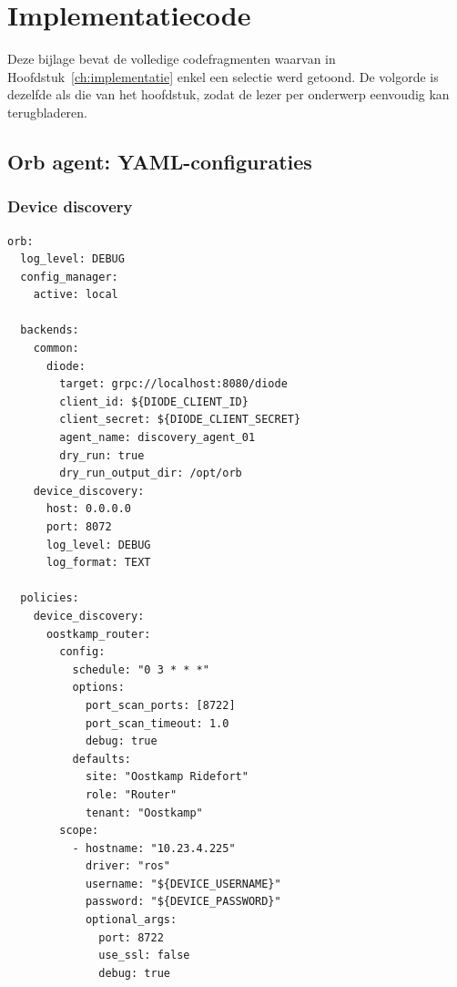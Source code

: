 
\chapter{Implementatiecode}%
\label{ch:bijlage-implementatie}

Deze bijlage bevat de volledige codefragmenten waarvan in Hoofdstuk~\ref{ch:implementatie} enkel een selectie werd getoond. De volgorde is dezelfde als die van het hoofdstuk, zodat de lezer per onderwerp eenvoudig kan terugbladeren.

\section{Orb agent: YAML-configuraties}
\label{sec:bijlage-orb-yaml}

\subsection{Device discovery}

\begin{listing}[H]
  \caption[Orb agent voor device discovery]{Volledige Orb-agentconfiguratie voor device discovery via Diode (\S\ref{sec:architectuur})}
  \label{lst:orb-device-discovery-config}
  \begin{verbatim}
orb:
  log_level: DEBUG
  config_manager:
    active: local

  backends:
    common:
      diode:
        target: grpc://localhost:8080/diode
        client_id: ${DIODE_CLIENT_ID}
        client_secret: ${DIODE_CLIENT_SECRET}
        agent_name: discovery_agent_01
        dry_run: true
        dry_run_output_dir: /opt/orb
    device_discovery:
      host: 0.0.0.0
      port: 8072
      log_level: DEBUG
      log_format: TEXT

  policies:
    device_discovery:
      oostkamp_router:
        config:
          schedule: "0 3 * * *"
          options:
            port_scan_ports: [8722]
            port_scan_timeout: 1.0
            debug: true
          defaults:
            site: "Oostkamp Ridefort"
            role: "Router"
            tenant: "Oostkamp"
        scope:
          - hostname: "10.23.4.225"
            driver: "ros"
            username: "${DEVICE_USERNAME}"
            password: "${DEVICE_PASSWORD}"
            optional_args:
              port: 8722
              use_ssl: false
              debug: true
  \end{verbatim}
\end{listing}

